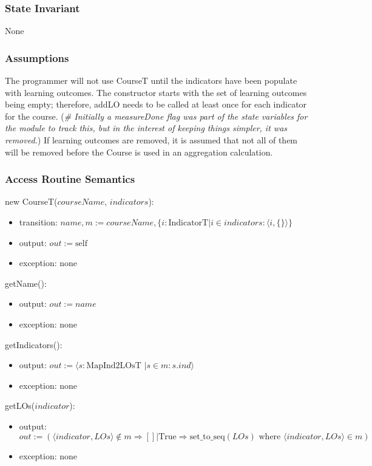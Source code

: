 \documentclass[12pt]{article}
\begin{document}
\subsubsection* {State Invariant}

None

\subsubsection* {Assumptions}

The programmer will not use CourseT until the indicators have been populate with
learning outcomes.  The constructor starts with the set of learning outcomes
being empty; therefore, addLO needs to be called at least once for each
indicator for the course.  (\textit{\# Initially a measureDone flag was part of
  the state variables for the module to track this, but in the interest of
  keeping things simpler, it was removed.})  If learning outcomes are removed,
it is assumed that not all of them will be removed before the Course is used in
an aggregation calculation.

\subsubsection* {Access Routine Semantics}

\noindent new CourseT($\mathit{courseName}$, $\mathit{indicators}$):
\begin{itemize}
\item transition: $\mathit{name}, m := \mathit{courseName}, \{i: \text{IndicatorT} |
  i \in \mathit{indicators} : \langle i, \{ \} \rangle \}$
\item output: $out := \mbox{self}$
\item exception: none
\end{itemize}

\noindent getName():
\begin{itemize}
\item output: $out := \mathit{name}$
\item exception: none
\end{itemize}

\noindent getIndicators():
\begin{itemize}
\item output: $out := \langle s: \text{MapInd2LOsT } | s \in m : s.\mathit{ind} \rangle$
\item exception: none
\end{itemize}

\noindent getLOs($\mathit{indicator}$):
\begin{itemize}
\item output:
  $out := (\langle \mathit{indicator}, \mathit{LOs} \rangle \not\in m
  \Rightarrow [] | \text{True} \Rightarrow \text{set\_to\_seq}(\mathit{LOs})
  \text{ where } \langle \mathit{indicator}, \mathit{LOs} \rangle \in m)$
\item exception: none
\end{itemize}
\end{document}
